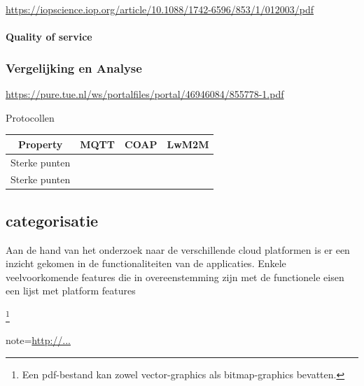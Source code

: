 \url{https://iopscience.iop.org/article/10.1088/1742-6596/853/1/012003/pdf}
\subsubparagraph{-----}

\paragraph{Quality of service}



\subsubsection{Vergelijking en Analyse}

\url{https://pure.tue.nl/ws/portalfiles/portal/46946084/855778-1.pdf}
\begin{frame}{Protocollen}
	\begin{table}[htbp]
		\centering
		\begin{tabular}{|c|c|c|c|}\hline
			Property&MQTT&COAP&LwM2M \cite{wikibooks}\cite{wikibooks} \\\hline
			
			
			
			Sterke punten &\multicolumn{1}{m{2cm}|}{}&\multicolumn{1}{m{4cm}|}{}&
			\multicolumn{1}{m{4cm}|}{ }\\\hline
			
			Sterke punten &\multicolumn{1}{m{2cm}|}{ }&\multicolumn{1}{m{4cm}|}{}&
			\multicolumn{1}{m{4cm}|}{ }\\\hline
			
			
			
		\end{tabular}
	\end{table}
	
\end{frame}

\subsection{categorisatie}
Aan de hand van het onderzoek naar de verschillende cloud platformen is er een inzicht gekomen in de functionaliteiten van de applicaties. Enkele veelvoorkomende features die in overeenstemming zijn met de functionele eisen een lijst met platform features

\footnote{Een pdf-bestand kan zowel vector-graphics als
	bitmap-graphics bevatten.}



note={\url{http://...}}


